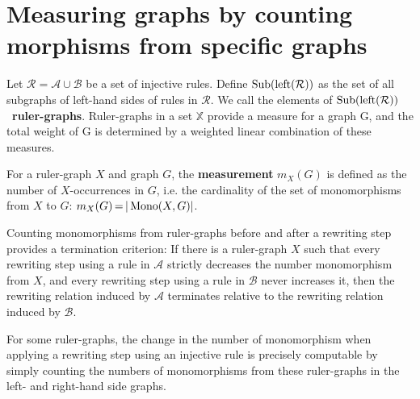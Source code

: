 
\section{Measuring graphs by counting morphisms from specific graphs}
\label{subgraph_counting:sec:interpretation}
Let $\mathcal{R} \mathop{=} \mathcal{A} \mathop{\cup} \mathcal{B}$ be a set of injective rules.
Define $\operatorname{Sub}(\operatorname{left}(\mathcal{R}))$ as the set of all subgraphs of left-hand sides of rules in $\mathcal{R}$.
We call the elements of $\operatorname{Sub}(\operatorname{left}(\mathcal{R}))$~\textbf{ruler-graphs}. Ruler-graphs in a set $\mathbb{X}$ provide a measure for a graph
G, and the total weight of G is determined by a weighted linear
combination of these measures.

\begin{definition} 
    \label{subgraph_counting:def:measurement}
    For a ruler-graph \( X \) and graph \( G \), the \textbf{measurement} \( m_X(G) \) is defined as the number of $X$-occurrences in $G$, i.e. the cardinality of the set of monomorphisms from $ X $ to $ G $:
    \(
        m_X(G) \mathop{=} |\operatorname{Mono}(X, G)|
    \).
\end{definition} 
Counting monomorphisms from ruler-graphs before and after a rewriting step provides a termination criterion: 
    If there is a ruler-graph $X$ such that every rewriting step using a rule in $\mathcal{A}$ strictly decreases the number monomorphism from $X$, and every rewriting step using a rule in $\mathcal{B}$ never increases it, then the rewriting relation induced by $\mathcal{A}$ terminates relative to the rewriting relation induced by $\mathcal{B}$.
 
For some ruler-graphs, the change in the number of monomorphism when applying a rewriting step using an injective rule is precisely computable by simply counting the numbers of monomorphisms from these ruler-graphs in the left- and right-hand side graphs. 

